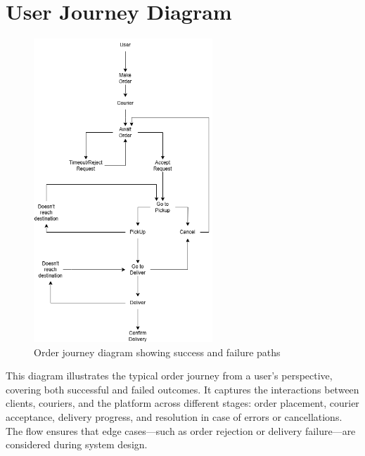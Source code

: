 \section{User Journey Diagram}

\begin{figure}[H]
    \centering
    \includegraphics[width=0.6\textwidth]{images/UserJourney.png} %
    \caption{Order journey diagram showing success and failure paths}
    \label{fig:user_journey}
\end{figure}

This diagram illustrates the typical order journey from a user's perspective, covering both successful and failed outcomes. It captures the interactions between clients, couriers, and the platform across different stages: order placement, courier acceptance, delivery progress, and resolution in case of errors or cancellations. The flow ensures that edge cases—such as order rejection or delivery failure—are considered during system design.

